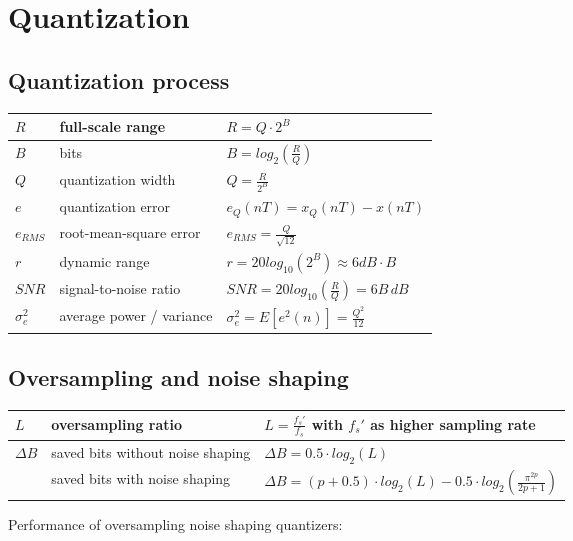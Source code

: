 \section{Quantization}

\subsection{Quantization process}
\begin{tabularx}{0.75\textwidth}{|l|X|X|}
	\hline
	$R$			& full-scale range		& $R = Q \cdot 2^B$
	\\ \hline
	$B$			& bits					& $B = log_2 \left(\frac{R}{Q}\right)$
	\\ \hline
	$Q$			& quantization width	& $Q = \frac{R}{2^B}$
	\\ \hline
	$e$			& quantization error	& $e_Q(nT) = x_Q(nT) -x(nT)$
	\\ \hline
	$e_{RMS}$	& root-mean-square error & $e_{RMS} = \frac{Q}{\sqrt{12}}$
	\\ \hline
	$r$	        & dynamic range         & $r = 20 log_{10}\left(2^B\right) \approx 6dB \cdot B$
	\\ \hline
	$SNR$		& signal-to-noise ratio	& $SNR = 20 log_{10}\left(\frac{R}{Q}\right) = 6B\, dB$
	\\ \hline
	$\sigma_e^2$& average power / variance & $\sigma_e^2 = E[e^2(n)] = \frac{Q^2}{12}$
	\\ \hline
\end{tabularx}


\subsection{Oversampling and noise shaping}
\begin{tabularx}{0.75\textwidth}{|l|l|X|}
	\hline
	$L$	& oversampling ratio	& $L = \frac{f_s'}{f_s}$ with $f_s'$ as higher sampling rate
	\\ \hline
	$\Delta B$	& saved bits without noise shaping	& $\Delta B = 0.5 \cdot log_2(L)$ \\
				& saved bits with noise shaping		& $\Delta B = (p + 0.5) \cdot log_2(L) - 0.5 \cdot log_2\left(\frac{\pi^{2p}}{2p + 1}\right)$
	\\ \hline
\end{tabularx}

Performance of oversampling noise shaping quantizers:

